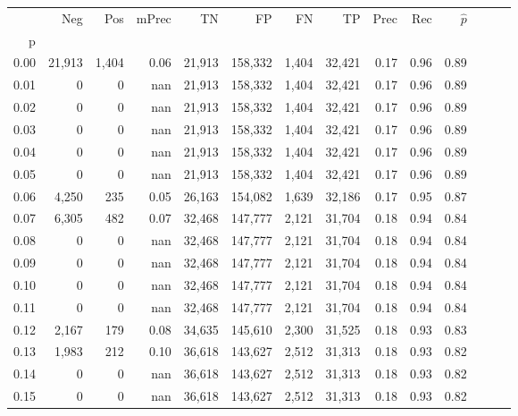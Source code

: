 \begin{tabular}{rrrrrrrrrrrrrr}
\toprule
{} &     Neg &    Pos & mPrec &       TN &       FP &      FN &      TP &  Prec &   Rec & $\hat{p}$ \\
p    &         &        &       &          &          &         &         &       &       &           \\
\midrule
0.00 &  21,913 &  1,404 &  0.06 &   21,913 &  158,332 &   1,404 &  32,421 &  0.17 &  0.96 &      0.89 \\
0.01 &       0 &      0 &   nan &   21,913 &  158,332 &   1,404 &  32,421 &  0.17 &  0.96 &      0.89 \\
0.02 &       0 &      0 &   nan &   21,913 &  158,332 &   1,404 &  32,421 &  0.17 &  0.96 &      0.89 \\
0.03 &       0 &      0 &   nan &   21,913 &  158,332 &   1,404 &  32,421 &  0.17 &  0.96 &      0.89 \\
0.04 &       0 &      0 &   nan &   21,913 &  158,332 &   1,404 &  32,421 &  0.17 &  0.96 &      0.89 \\
0.05 &       0 &      0 &   nan &   21,913 &  158,332 &   1,404 &  32,421 &  0.17 &  0.96 &      0.89 \\
0.06 &   4,250 &    235 &  0.05 &   26,163 &  154,082 &   1,639 &  32,186 &  0.17 &  0.95 &      0.87 \\
0.07 &   6,305 &    482 &  0.07 &   32,468 &  147,777 &   2,121 &  31,704 &  0.18 &  0.94 &      0.84 \\
0.08 &       0 &      0 &   nan &   32,468 &  147,777 &   2,121 &  31,704 &  0.18 &  0.94 &      0.84 \\
0.09 &       0 &      0 &   nan &   32,468 &  147,777 &   2,121 &  31,704 &  0.18 &  0.94 &      0.84 \\
0.10 &       0 &      0 &   nan &   32,468 &  147,777 &   2,121 &  31,704 &  0.18 &  0.94 &      0.84 \\
0.11 &       0 &      0 &   nan &   32,468 &  147,777 &   2,121 &  31,704 &  0.18 &  0.94 &      0.84 \\
0.12 &   2,167 &    179 &  0.08 &   34,635 &  145,610 &   2,300 &  31,525 &  0.18 &  0.93 &      0.83 \\
0.13 &   1,983 &    212 &  0.10 &   36,618 &  143,627 &   2,512 &  31,313 &  0.18 &  0.93 &      0.82 \\
0.14 &       0 &      0 &   nan &   36,618 &  143,627 &   2,512 &  31,313 &  0.18 &  0.93 &      0.82 \\
0.15 &       0 &      0 &   nan &   36,618 &  143,627 &   2,512 &  31,313 &  0.18 &  0.93 &      0.82 \\

\end{tabular}

